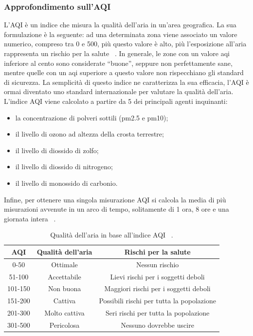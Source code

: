 \subsubsection{Approfondimento sull'AQI}
L'AQI è un indice che misura la qualità dell'aria in un'area geografica.
La sua formulazione è la seguente: ad una determinata zona viene associato un valore numerico, compreso tra 0 e 500, più questo valore è alto, più l'esposizione all'aria rappresenta un rischio per la salute ~\cite{aqibasics}.
In generale, le zone con un valore aqi inferiore al cento sono considerate “buone”, seppure non perfettamente sane, mentre quelle con un aqi superiore a questo valore non rispecchiano gli standard di sicurezza.
La semplicità di questo indice ne caratterizza la sua efficacia, l'AQI è ormai diventato uno standard internazionale per valutare la qualità dell'aria.
L'indice AQI viene calcolato a partire da 5 dei principali agenti inquinanti:
\begin{itemize}
  \item{la concentrazione di polveri sottili (pm2.5 e pm10);}
  \item{il livello di ozono ad altezza della crosta terrestre;}
  \item{il livello di diossido di zolfo;}
  \item{il livello di diossido di nitrogeno;}
  \item{il livello di monossido di carbonio.}  
\end{itemize}
Infine, per ottenere una singola misurazione AQI si calcola la media di più misurazioni avvenute in un arco di tempo, solitamente di 1 ora, 8 ore e una giornata intera ~\cite{aqibasics}.
	

\begin{table}[h]
  \centering
  \caption{Qualità dell'aria in base all'indice AQI ~\cite{aqibasics}.}
  \label{tab:aqi}
  \begin{tabular}{|c|c|c|}
    \hline
    AQI & Qualità dell'aria & Rischi per la salute \\ \hline
    \rowcolor{Green} 0-50 & Ottimale & Nessun rischio \\ \hline
    \rowcolor{Yellow} 51-100 & Accettabile & Lievi rischi per i soggetti deboli \\ \hline
    \rowcolor{Orange} 101-150 & Non buona & Maggiori rischi per i soggetti deboli \\ \hline
    \rowcolor{Red} 151-200 & Cattiva & Possibili rischi per tutta la popolazione \\ \hline
    \rowcolor{Purple} 201-300 & Molto cattiva & Seri rischi per tutta la popolazione \\ \hline
    \rowcolor{Maroon} 301-500 & Pericolosa & Nessuno dovrebbe uscire \\ \hline
  \end{tabular}
\end{table}


